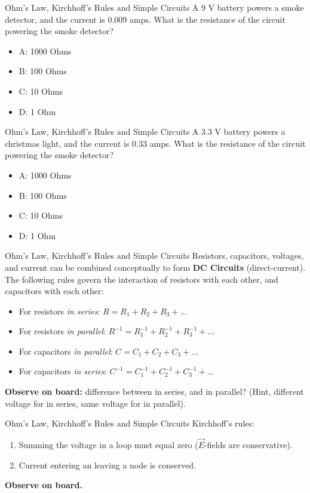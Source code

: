 \documentclass{beamer}
\begin{document}
\begin{frame}{Ohm's Law, Kirchhoff's Rules and Simple Circuits}
A 9 V battery powers a smoke detector, and the current is 0.009 amps.  What is the resistance of the circuit powering the smoke detector?
\begin{itemize}
\item A: 1000 Ohms
\item B: 100 Ohms
\item C: 10 Ohms
\item D: 1 Ohm
\end{itemize}
\end{frame}

\begin{frame}{Ohm's Law, Kirchhoff's Rules and Simple Circuits}
A 3.3 V battery powers a christmas light, and the current is 0.33 amps.  What is the resistance of the circuit powering the smoke detector?
\begin{itemize}
\item A: 1000 Ohms
\item B: 100 Ohms
\item C: 10 Ohms
\item D: 1 Ohm
\end{itemize}
\end{frame}

\begin{frame}{Ohm's Law, Kirchhoff's Rules and Simple Circuits}
Resistors, capacitors, voltages, and current can be combined conceptually to form \alert{\textbf{DC Circuits}} (direct-current).  The following rules govern the interaction of resistors with each other, and capacitors with each other:
\begin{itemize}
\item For resistors \textit{in series}: $R = R_1 + R_2 + R_3 + ...$
\item For resistors \textit{in parallel}: $R^{-1} = R_1^{-1} + R_2^{-1} + R_3^{-1} + ...$
\item For capacitors \textit{in parallel}: $C = C_1 + C_2 + C_3 + ...$
\item For capacitors \textit{in series}: $C^{-1} = C_1^{-1} + C_2^{-1} + C_3^{-1} + ...$
\end{itemize}
\textbf{Observe on board:} difference between in series, and in parallel? (Hint, different voltage for in series, same voltage for in parallel).
\end{frame}

\begin{frame}{Ohm's Law, Kirchhoff's Rules and Simple Circuits}
Kirchhoff's rules:
\begin{enumerate}
\item Summing the voltage in a loop must equal zero ($\vec{E}$-fields are conservative).
\item Current entering an leaving a node is conserved.
\end{enumerate}
\textbf{Observe on board.}
\end{frame}
\end{document}
